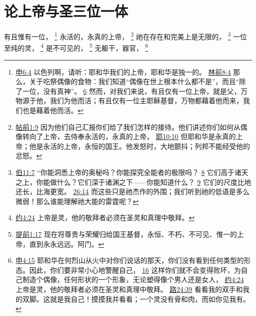 \documentclass[12pt, a4paper, oneside]{ctexart}
\newcounter{parnum}[section]
\newcommand{\N}{%
   \noindent\refstepcounter{parnum}%
    \makebox[\parindent][l]{\textbf{\arabic{parnum}.}}}
\begin{document}
\section{论上帝与圣三位一体}

\N 有且惟有一位，
	\footnote {
		\href{https://biblehub.com/deuteronomy/6-4.htm}{申6:4} 以色列啊，请听：耶和华我们的上帝，耶和华是独一的。
		\href{https://biblehub.com/1_corinthians/8-4.htm}{林前8:4} 那么，关于吃祭偶像的食物：我们知道“偶像在世上根本什么都不是”，而且“除了一位，没有真神”。
		\href{https://biblehub.com/1_corinthians/8-6.htm}{6} 然而，对我们来说，有且仅有一位上帝，就是父，万物源于他，我们为他而活；有且仅有一位主耶稣基督，万物都藉着他而来，我们也是藉着他而活。
	}
	永活的，永真的上帝，
	\footnote {
		\href{https://biblehub.com/1_thessalonians/1-9.htm}{帖前1:9} 因为他们自己汇报你们给了我们怎样的接待。他们讲述你们如何从偶像转向了上帝，去侍奉永活的，永真的上帝，
		\href{https://biblehub.com/jeremiah/10-10.htm}{耶10:10} 但耶和华是永真的上帝；他是永活的上帝，永恒的国王。他发怒时，大地颤抖；列邦不能经受他的忿怒。	
	}
	祂在存在和完美上是无限的，
	\footnote {
		\href{https://biblehub.com/job/11-7.htm}{伯11:7} “你能洞悉上帝的奥秘吗？你能探究全能者的极限吗？
		\href{https://biblehub.com/job/11-8.htm}{8} 它们高于诸天之上，你能做什么？它们深于诸渊之下——你能知道什么？
		\href{https://biblehub.com/job/11-9.htm}{9} 它们的尺度比地还长，比海更宽。
		\href{https://biblehub.com/job/26-14.htm}{26:14} 而这些只是祂杰作的外围；我们听到祂的低语是多么微弱！那么谁能理解祂大能的雷霆呢？
	}
	一位至纯的灵，
	\footnote {
		\href{https://biblehub.com/john/4-24.htm}{约4:24} 上帝是灵，他的敬拜者必须在圣灵和真理中敬拜。
	}
	是不可见的，
	\footnote {
		\href{https://biblehub.com/1_timothy/1-17.htm}{提前1:17} 现在将尊贵与荣耀归给国王基督，永恒、不朽、不可见、惟一的上帝，直到永永远远。阿门。
	}
	无躯干，器官，
	\footnote {
		\href{https://biblehub.com/deuteronomy/4-15.htm}{申4:15} 耶和华在何烈山从火中对你们说话的那天，你们没有看到任何类型的形态。因此，你们要非常小心地警醒自己，
		\href{https://biblehub.com/deuteronomy/4-16.htm}{16} 这样你们就不会变得败坏，为自己制造个偶像，任何形状的一个形象，无论塑得像个男人还是女人，
		\href{https://biblehub.com/john/4-24.htm}{约4:24} 上帝是灵，他的敬拜者必须在圣灵和真理中敬拜。
		\href{https://biblehub.com/john/24-39.htm}{路24:39} 看看我的双手和我的双脚。这就是我自己！摸摸我并看看；一个灵没有骨和肉，而如你见我有。
	}
\end{document}
